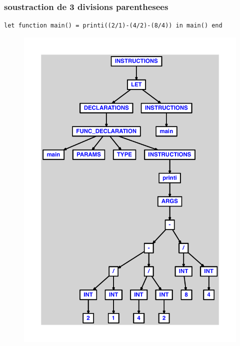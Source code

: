 \documentclass{article}
\begin{document}
\subsubsection{soustraction de 3 divisions parenthesees}
\begin{lstlisting}
let function main() = printi((2/1)-(4/2)-(8/4)) in main() end
\end{lstlisting}
\newpage
\begin{figure}[H]
\centering
\includegraphics[max width=\textwidth]{ast/ast_110.pdf}
\end{figure}
\newpage
\end{document}
